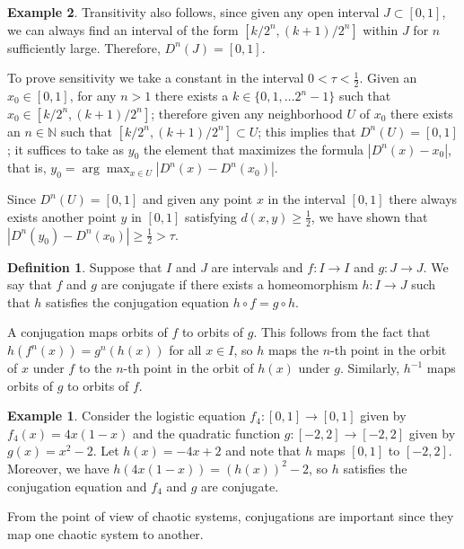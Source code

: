 \documentclass[12pt,a4paper]{report}
\theoremstyle{definition}
\newtheorem{ejemplo}{Example}[section]
\newtheorem{definicion}{Definition}[section]
\begin{document}
\begin{ejemplo}
Transitivity also follows, since given any open interval $ J \subset [0,1]$, we can always find an interval of the form $[k/2^n, (k+1)/2^n]$ within $ J $ for $ n $ sufficiently large. Therefore, $ D^n(J)  = [0,1]$. 

To prove sensitivity we take a constant in the interval $ 0 < \tau < \frac{1}{2}$. Given an $x_0 \in [0,1]$,
for any $n > 1$ there exists a $k \in \{0, 1 , \ldots 2^n - 1 \}$ such that $x_0 \in [k/2^n, (k+1)/2^n]$; therefore given any neighborhood $U$ of $x_0$ there exists an $n \in \mathbb{N}$ such that $[k/2^n, (k+1)/2^n] \subset U$; this implies that $ D^n(U)  = [0,1]$; it suffices to take as $y_0$ the element that maximizes the formula $\left| D^n(x) - x_0\right| $, that is, $y_0 = \arg\max_{x \in U} \left| D^n(x) - D^n(x_0)\right| $.

Since $ D^n(U)  = [0,1]$ and given any point $x$ in the interval $[0,1]$ there always exists another point $y$ in $[0,1]$ satisfying $d(x,y) \geq \frac{1}{2}$, we have shown that $|D^{n}(y_0) - D^{n}(x_0)| \geq \frac{1}{2} > \tau$.


\begin{definicion}
    
Suppose that $I$ and $J$ are intervals and $f: I \to I$ and $g: J \to J$. We say that $f$ and $g$ are conjugate if there exists a homeomorphism $h: I \to J$ such that $h$ satisfies the conjugation equation $h \circ f = g \circ h$.

\end{definicion}

A conjugation maps orbits of $f$ to orbits of $g$. This follows from the fact that $h(f^n(x)) = g^n(h(x))$ for all $x \in I$, so $h$ maps the $n$-th point in the orbit of $x$ under $f$ to the $n$-th point in the orbit of $h(x)$ under $g$. Similarly, $h^{-1}$ maps orbits of $g$ to orbits of $f$.


\begin{ejemplo}
    
Consider the logistic equation $f_4: [0,1] \to [0,1]$ given by $f_4(x) = 4x(1-x)$ and the quadratic function $g: [-2,2] \to [-2,2]$ given by $g(x) = x^2 - 2$. Let $h(x) = -4x + 2$ and note that $h$ maps $[0,1]$ to $[-2,2]$. Moreover, we have $h(4x(1-x)) = (h(x))^2 - 2$, so $h$ satisfies the conjugation equation and $f_4$ and $g$ are conjugate.

\end{ejemplo}

From the point of view of chaotic systems, conjugations are important since they map one chaotic system to another.


\end{ejemplo}
\end{document}
